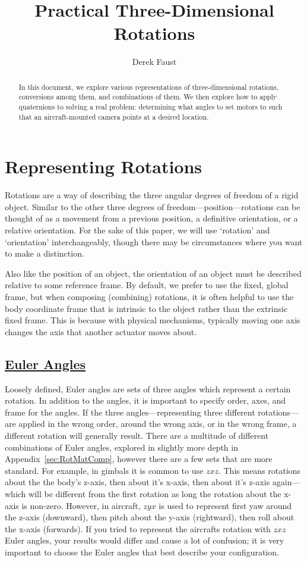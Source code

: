 \documentclass[letterpaper,10pt]{article}
\title{Practical Three-Dimensional Rotations}
\author{Derek Faust}
\begin{document}
\maketitle
\begin{abstract}
In this document, we explore various representations of three-dimensional rotations, conversions among them, and combinations of them. We then explore how to apply quaternions to solving a real problem: determining what angles to set motors to such that an aircraft-mounted camera points at a desired location.
\end{abstract}

\tableofcontents

\newpage
\section{Representing Rotations}
Rotations are a way of describing the three angular degrees of freedom of a rigid object. Similar to the other three degrees of freedom---position---rotations can be thought of as a movement from a previous position, a definitive orientation, or a relative orientation. For the sake of this paper, we will use `rotation' and `orientation' interchangeably, though there may be circumstances where you want to make a distinction.

Also like the position of an object, the orientation of an object must be described relative to some reference frame. By default, we prefer to use the fixed, global frame, but when composing (combining) rotations, it is often helpful to use the body coordinate frame that is intrinsic to the object rather than the extrinsic fixed frame. This is because with physical mechanisms, typically moving one axis changes the axis that another actuator moves about.

\subsection{\href{http://en.wikipedia.org/wiki/Euler_angles}{Euler Angles}}
Loosely defined, Euler angles are sets of three angles which represent a certain rotation. In addition to the angles, it is important to specify order, axes, and frame for the angles. If the three angles---representing three different rotations---are applied in the wrong order, around the wrong axis, or in the wrong frame, a different rotation will generally result. There are a multitude of different combinations of Euler angles, explored in slightly more depth in Appendix~\ref{sec:RotMatComp}, however there are a few sets that are more standard. For example, in gimbals it is common to use $zxz$. This means rotations about the the body's z-axis, then about it's x-axis, then about it's z-axis again---which will be different from the first rotation as long the rotation about the x-axis is non-zero. However, in aircraft, $zyx$ is used to represent first yaw around the z-axis (downward), then pitch about the y-axis (rightward), then roll about the x-axis (forwards). If you tried to represent the aircrafts rotation with $zxz$ Euler angles, your results would differ and cause a lot of confusion; it is very important to choose the Euler angles that best describe your configuration.
\end{document}
